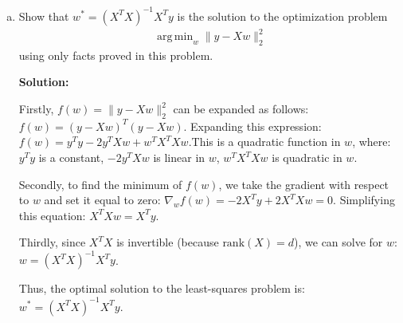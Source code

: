 \documentclass{article}
\DeclareMathOperator*{\argmin}{arg\,min}
\newenvironment{solution}{\color{blue} \smallskip \textbf{Solution:}}{}
\begin{document}
\begin{enumerate}[(a)]
\begin{solution}
Secondly, we prove that \( P \) annihilates vectors orthogonal to \( \text{range}(X) \) (i.e., for any vector \( z \in \text{range}(X)^\perp \), \( P z = 0 \)). Let \( z \in \text{range}(X)^\perp \), meaning that \( z \) is orthogonal to the columns of \( X \). This implies that \( X^T z = 0 \). Now, apply \( P = X(X^T X)^{-1} X^T \) to \( z \): \( P z = X(X^T X)^{-1} X^T z \). Since \( X^T z = 0 \), we have: \( P z = X(X^T X)^{-1} 0 = X 0 = 0 \). Thus, \( P z = 0 \) for any \( z \in \text{range}(X)^\perp \).

These two properties will confirm that \( P = X(X^T X)^{-1} X^T \) is the projection matrix onto \( \text{range}(X) \).

    \end{solution}

    \newpage
    \item
    Show that $w^{*} = (X^{T}X)^{-1}X^{T}y$ is the solution to the optimization problem
    \begin{align*}
        \argmin_{w} \|y - Xw\|_{2}^{2}
    \end{align*}
    using only facts proved in this problem.
    
    \begin{solution}

Firstly, \( f(w) = \|y - Xw\|_2^2 \) can be expanded as follows: \( f(w) = (y - Xw)^T (y - Xw) \). Expanding this expression: \( f(w) = y^T y - 2 y^T Xw + w^T X^T Xw \).This is a quadratic function in \( w \), where: \( y^T y \) is a constant, \( -2 y^T Xw \) is linear in \( w \), \( w^T X^T Xw \) is quadratic in \( w \).

Secondly, to find the minimum of \( f(w) \), we take the gradient with respect to \( w \) and set it equal to zero: \( \nabla_w f(w) = -2 X^T y + 2 X^T Xw = 0 \). Simplifying this equation: \( X^T Xw = X^T y \).

Thirdly, since \( X^T X \) is invertible (because \( \text{rank}(X) = d \)), we can solve for \( w \): \( w = (X^T X)^{-1} X^T y \).

Thus, the optimal solution to the least-squares problem is: \( w^* = (X^T X)^{-1} X^T y \).

    \end{solution}

\end{enumerate}
\end{document}
